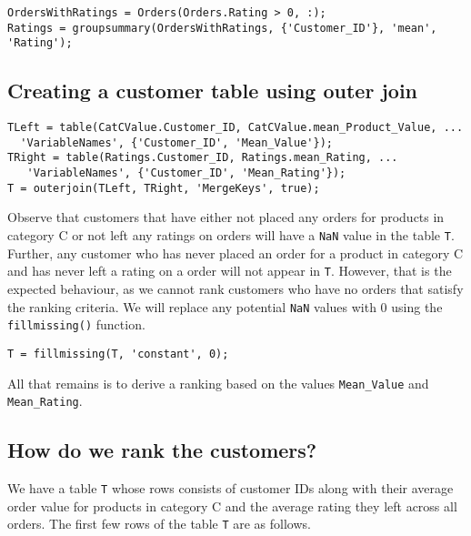 \begin{lstlisting}
OrdersWithRatings = Orders(Orders.Rating > 0, :);
Ratings = groupsummary(OrdersWithRatings, {'Customer_ID'}, 'mean', 'Rating');
\end{lstlisting}

\newpage
\subsection{Creating a customer table using outer join}


\begin{lstlisting}
TLeft = table(CatCValue.Customer_ID, CatCValue.mean_Product_Value, ...
  'VariableNames', {'Customer_ID', 'Mean_Value'});
TRight = table(Ratings.Customer_ID, Ratings.mean_Rating, ...
   'VariableNames', {'Customer_ID', 'Mean_Rating'});
T = outerjoin(TLeft, TRight, 'MergeKeys', true);
\end{lstlisting}

\noindent
Observe that customers that have either not placed any orders for products in category C or not left any ratings on orders will have a \lstinline|NaN| value in the table \lstinline|T|. Further, any customer who has never placed an order for a product in category C and has never left a rating on a order will not appear in \lstinline|T|. However, that is the expected behaviour, as we cannot rank customers who have no orders that satisfy the ranking criteria. We will replace any potential \lstinline|NaN| values with 0 using the \lstinline|fillmissing()| function.

\begin{lstlisting}
T = fillmissing(T, 'constant', 0);
\end{lstlisting}

\noindent
All that remains is to derive a ranking based on the values \lstinline|Mean_Value| and \lstinline|Mean_Rating|. \\

\subsection{How do we rank the customers?}
We have a table \lstinline|T| whose rows consists of customer IDs along with their average order value for products in category C and the average rating they left across all orders. The first few rows of the table \lstinline|T| are as follows.

